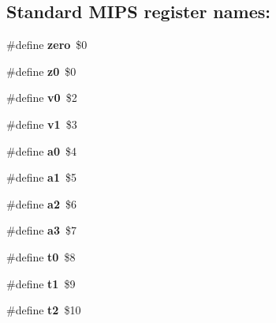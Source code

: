 \subsection*{Standard M\+I\+PS register names\+:}
\begin{DoxyCompactItemize}
\item 
\mbox{\label{group__mips__regs_ga361b1d0588e13a7b5994f24b40138ec0}} 
\#define {\bfseries zero}~\$0
\item 
\mbox{\label{group__mips__regs_ga3f5c4dfb0dff56801752771f78265fbe}} 
\#define {\bfseries z0}~\$0
\item 
\mbox{\label{group__mips__regs_ga2b3f75463b42545c79b95790e5bc0329}} 
\#define {\bfseries v0}~\$2
\item 
\mbox{\label{group__mips__regs_gae6c3ee9933cc50ea02782419401e84f0}} 
\#define {\bfseries v1}~\$3
\item 
\mbox{\label{group__mips__regs_gaa42b800f0f58b50bc7604c67cc2853ab}} 
\#define {\bfseries a0}~\$4
\item 
\mbox{\label{group__mips__regs_gab89a77e63a7226fffaecb2e2c2ab5219}} 
\#define {\bfseries a1}~\$5
\item 
\mbox{\label{group__mips__regs_gaa3fd046b2956875cf908d73a51a96b42}} 
\#define {\bfseries a2}~\$6
\item 
\mbox{\label{group__mips__regs_ga2ef3c16c90bcffd5105806b0180c9a96}} 
\#define {\bfseries a3}~\$7
\item 
\mbox{\label{group__mips__regs_ga30084bbf7aceeb26e3e6c2dbc88cfa33}} 
\#define {\bfseries t0}~\$8
\item 
\mbox{\label{group__mips__regs_ga65f7891fccbfcf7d08964555630773b3}} 
\#define {\bfseries t1}~\$9
\item 
\mbox{\label{group__mips__regs_gaa4652e2d6053d420dcbea07a113db5fe}} 
\#define {\bfseries t2}~\$10
\item 

\end{DoxyCompactItemize}
